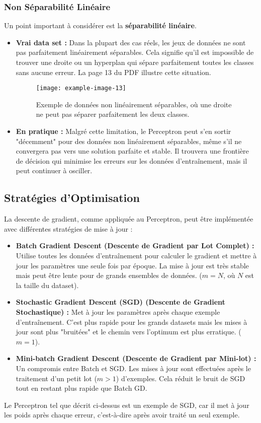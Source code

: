 \documentclass{article}
\begin{document}
\subsubsection{Non Séparabilité Linéaire}
Un point important à considérer est la \textbf{séparabilité linéaire}.
\begin{itemize}
    \item \textbf{Vrai data set :} Dans la plupart des cas réels, les jeux de données ne sont pas parfaitement linéairement séparables. Cela signifie qu'il est impossible de trouver une droite ou un hyperplan qui sépare parfaitement toutes les classes sans aucune erreur. La page 13 du PDF illustre cette situation.
    \begin{figure}[h!]
        \centering
        \texttt{[image: example-image-13]} %
        \caption{Exemple de données non linéairement séparables, où une droite ne peut pas séparer parfaitement les deux classes.}
    \end{figure}
    \item \textbf{En pratique :} Malgré cette limitation, le Perceptron peut s'en sortir "décemment" pour des données non linéairement séparables, même s'il ne convergera pas vers une solution parfaite et stable. Il trouvera une frontière de décision qui minimise les erreurs sur les données d'entraînement, mais il peut continuer à osciller.
\end{itemize}

\subsection{Stratégies d'Optimisation}
La descente de gradient, comme appliquée au Perceptron, peut être implémentée avec différentes stratégies de mise à jour :
\begin{itemize}
    \item \textbf{Batch Gradient Descent (Descente de Gradient par Lot Complet) :} Utilise toutes les données d'entraînement pour calculer le gradient et mettre à jour les paramètres une seule fois par époque. La mise à jour est très stable mais peut être lente pour de grands ensembles de données. ($m=N$, où $N$ est la taille du dataset).
    \item \textbf{Stochastic Gradient Descent (SGD) (Descente de Gradient Stochastique) :} Met à jour les paramètres après chaque exemple d'entraînement. C'est plus rapide pour les grands datasets mais les mises à jour sont plus "bruitées" et le chemin vers l'optimum est plus erratique. ($m=1$).
    \item \textbf{Mini-batch Gradient Descent (Descente de Gradient par Mini-lot) :} Un compromis entre Batch et SGD. Les mises à jour sont effectuées après le traitement d'un petit lot ($m>1$) d'exemples. Cela réduit le bruit de SGD tout en restant plus rapide que Batch GD.
\end{itemize}
Le Perceptron tel que décrit ci-dessus est un exemple de SGD, car il met à jour les poids après chaque erreur, c'est-à-dire après avoir traité un seul exemple.
\end{document}
